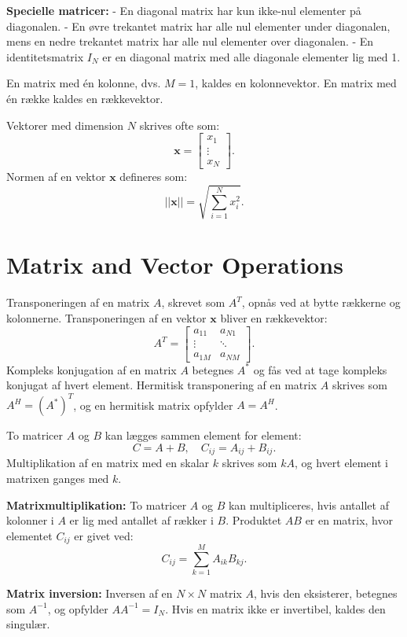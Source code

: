 \documentclass[a4paper,12pt]{book}
\begin{document}
	\textbf{Specielle matricer:}
	- En diagonal matrix har kun ikke-nul elementer på diagonalen.
	- En øvre trekantet matrix har alle nul elementer under diagonalen, mens en nedre trekantet matrix har alle nul elementer over diagonalen.
	- En identitetsmatrix \(I_N\) er en diagonal matrix med alle diagonale elementer lig med 1.
	
	En matrix med én kolonne, dvs. \(M = 1\), kaldes en kolonnevektor. En matrix med én række kaldes en rækkevektor.
	
	Vektorer med dimension \(N\) skrives ofte som:
	\[
	\mathbf{x} = \begin{bmatrix}
		x_1 \\
		\vdots \\
		x_N
	\end{bmatrix}.
	\]
	Normen af en vektor \(\mathbf{x}\) defineres som:
	\[
	||\mathbf{x}|| = \sqrt{\sum_{i=1}^{N} x_i^2}.
	\]
	
	\section{Matrix and Vector Operations}
	Transponeringen af en matrix \(A\), skrevet som \(A^T\), opnås ved at bytte rækkerne og kolonnerne. Transponeringen af en vektor \(\mathbf{x}\) bliver en rækkevektor:
	\[
	A^T = \begin{bmatrix}
		a_{11} & a_{N1} \\
		\vdots & \ddots \\
		a_{1M} & a_{NM}
	\end{bmatrix}.
	\]
	Kompleks konjugation af en matrix \(A\) betegnes \(A^*\) og fås ved at tage kompleks konjugat af hvert element. Hermitisk transponering af en matrix \(A\) skrives som \(A^H = (A^*)^T\), og en hermitisk matrix opfylder \(A = A^H\).
	
	To matricer \(A\) og \(B\) kan lægges sammen element for element:
	\[
	C = A + B,\quad C_{ij} = A_{ij} + B_{ij}.
	\]
	Multiplikation af en matrix med en skalar \(k\) skrives som \(kA\), og hvert element i matrixen ganges med \(k\).
	
	\textbf{Matrixmultiplikation:} To matricer \(A\) og \(B\) kan multipliceres, hvis antallet af kolonner i \(A\) er lig med antallet af rækker i \(B\). Produktet \(AB\) er en matrix, hvor elementet \(C_{ij}\) er givet ved:
	\[
	C_{ij} = \sum_{k=1}^{M} A_{ik} B_{kj}.
	\]
	
	\textbf{Matrix inversion:} Inversen af en \(N \times N\) matrix \(A\), hvis den eksisterer, betegnes som \(A^{-1}\), og opfylder \(AA^{-1} = I_N\). Hvis en matrix ikke er invertibel, kaldes den singulær.
	
\end{document}
